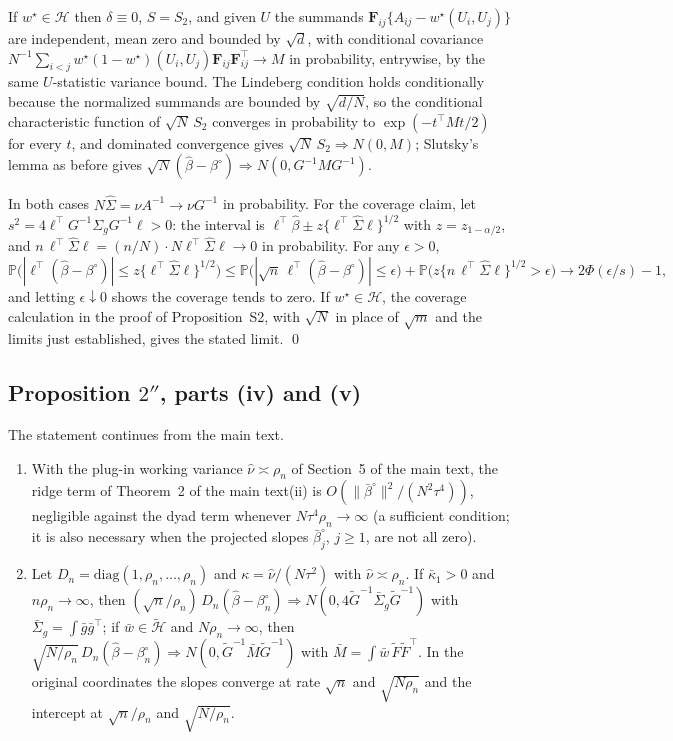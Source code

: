\documentclass[12pt]{article}
\newcommand{\Prob}{\mathbb{P}}
\newcommand{\calH}{\mathcal{H}}
\newcommand{\norm}[1]{\|#1\|}
\newcommand{\wstar}{w^{\star}}
\newcommand{\bproj}{\beta^{\circ}}
\newcommand{\bhat}{\hat\beta}
\newcommand{\Sighat}{\hat\Sigma}
\newcommand{\Fv}{\mathbf{F}}
\begin{document}
If $\wstar\in\calH$ then $\delta\equiv0$, $S=S_2$, and given $U$ the summands $\Fv_{ij}\{A_{ij}-\wstar(U_i,U_j)\}$ are independent, mean zero and bounded by $\sqrt d$, with conditional covariance $N^{-1}\sum_{i<j}\wstar(1-\wstar)(U_i,U_j)\Fv_{ij}\Fv_{ij}^{\top}\to M$ in probability, entrywise, by the same $U$-statistic variance bound. The Lindeberg condition holds conditionally because the normalized summands are bounded by $\sqrt{d/N}$, so the conditional characteristic function of $\sqrt N\,S_2$ converges in probability to $\exp(-t^{\top}Mt/2)$ for every $t$, and dominated convergence gives $\sqrt N\,S_2\Rightarrow N(0,M)$; Slutsky's lemma as before gives $\sqrt N(\bhat-\bproj)\Rightarrow N(0,G^{-1}MG^{-1})$.

In both cases $N\Sighat=\nu A^{-1}\to\nu G^{-1}$ in probability. For the coverage claim, let $s^2=4\ell^{\top}G^{-1}\Sigma_gG^{-1}\ell>0$: the interval is $\ell^{\top}\bhat\pm z\{\ell^{\top}\Sighat\ell\}^{1/2}$ with $z=z_{1-\alpha/2}$, and $n\,\ell^{\top}\Sighat\ell=(n/N)\cdot N\ell^{\top}\Sighat\ell\to0$ in probability. For any $\epsilon>0$,
\[
\Prob\big(|\ell^{\top}(\bhat-\bproj)|\le z\{\ell^{\top}\Sighat\ell\}^{1/2}\big)\le\Prob\big(|\sqrt n\,\ell^{\top}(\bhat-\bproj)|\le\epsilon\big)+\Prob\big(z\{n\,\ell^{\top}\Sighat\ell\}^{1/2}>\epsilon\big)\to2\Phi(\epsilon/s)-1,
\]
and letting $\epsilon\downarrow0$ shows the coverage tends to zero. If $\wstar\in\calH$, the coverage calculation in the proof of Proposition~S2, with $\sqrt N$ in place of $\sqrt m$ and the limits just established, gives the stated limit. \qed

\subsection*{Proposition $2''$, parts (iv) and (v)}
The statement continues from the main text.
\begin{enumerate}
\item[(iv)] With the plug-in working variance $\hat\nu\asymp\rho_n$ of Section~5 of the main text, the ridge term of Theorem~2 of the main text(ii) is $O(\norm{\bar\beta^{\circ}}^2/(N^2\tau^4))$, negligible against the dyad term whenever $N\tau^4\rho_n\to\infty$ (a sufficient condition; it is also necessary when the projected slopes $\bar\beta^{\circ}_j$, $j\ge1$, are not all zero).
\item[(v)] Let $D_n=\mathrm{diag}(1,\rho_n,\dots,\rho_n)$ and $\kappa=\hat\nu/(N\tau^2)$ with $\hat\nu\asymp\rho_n$. If $\bar\kappa_1>0$ and $n\rho_n\to\infty$, then $(\sqrt n/\rho_n)\,D_n(\bhat-\beta^{\circ}_n)\Rightarrow N(0,4\tilde G^{-1}\bar\Sigma_g\tilde G^{-1})$ with $\bar\Sigma_g=\int\bar g\bar g^{\top}$; if $\bar w\in\tilde{\calH}$ and $N\rho_n\to\infty$, then $\sqrt{N/\rho_n}\,D_n(\bhat-\beta^{\circ}_n)\Rightarrow N(0,\tilde G^{-1}\bar M\tilde G^{-1})$ with $\bar M=\int\bar w\,\tilde F\tilde F^{\top}$. In the original coordinates the slopes converge at rate $\sqrt n$ and $\sqrt{N\rho_n}$ and the intercept at $\sqrt n/\rho_n$ and $\sqrt{N/\rho_n}$.
\end{enumerate}
\end{document}
